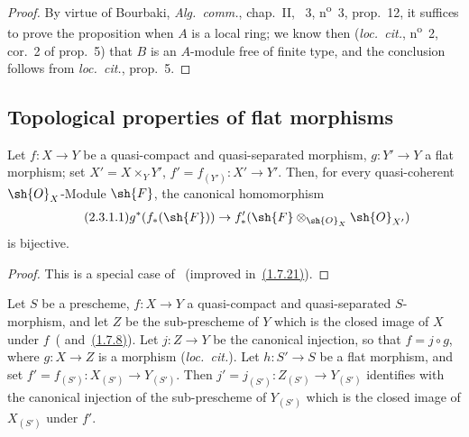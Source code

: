 \begin{proof}
By virtue of Bourbaki, \emph{Alg.~comm.}, chap.~II, \textsection~3, n\textsuperscript{o}~3, prop.~12, it suffices to prove the proposition when $A$ is a local ring; we know then (\emph{loc.~cit.}, n\textsuperscript{o}~2, cor.~2 of prop.~5) that $B$ is an $A$-module free of finite type, and the conclusion follows from \emph{loc.~cit.}, prop.~5.
\end{proof}

\subsection{Topological properties of flat morphisms}
\label{subsection:IV.2.3}

\begin{lemma}[2.3.1]
\label{IV.2.3.1}
Let $f:X\to Y$ be a quasi-compact and quasi-separated morphism, $g:Y'\to Y$ a flat morphism; set $X'=X\times_Y Y'$, $f'=f_{(Y')}:X'\to Y'$.
Then, for every quasi-coherent $\sh{O}_X$-Module $\sh{F}$, the canonical homomorphism
\begin{equation}
\tag{2.3.1.1}
\label{IV.2.3.1.1}
  g^*(f_*(\sh{F})) \to f'_*(\sh{F}\otimes_{\sh{O}_X}\sh{O}_{X'})
\end{equation}
is bijective.
\end{lemma}

\begin{proof}
This is a special case of~ (improved in~{\hyperlink{ega4.c04.statement.1-7-21}{(1.7.21)}}).
\end{proof}

\begin{proposition}[2.3.2]
\label{IV.2.3.2}
Let $S$ be a prescheme, $f:X\to Y$ a quasi-compact and quasi-separated $S$-morphism, and let $Z$ be the sub-prescheme of $Y$ which is the closed image of $X$ under $f$~\textnormal{(} and~{\hyperlink{ega4.c04.statement.1-7-8}{(1.7.8)}}\textnormal{)}.
Let $j:Z\to Y$ be the canonical injection, so that $f=j\circ g$, where $g:X\to Z$ is a morphism \textnormal{(}\emph{loc.~cit.}\textnormal{)}.
Let $h:S'\to S$ be a flat morphism, and set $f'=f_{(S')}:X_{(S')}\to Y_{(S')}$.
Then $j'=j_{(S')}:Z_{(S')}\to Y_{(S')}$ identifies with the canonical injection of the sub-prescheme of $Y_{(S')}$ which is the closed image of $X_{(S')}$ under $f'$.
\end{proposition}

